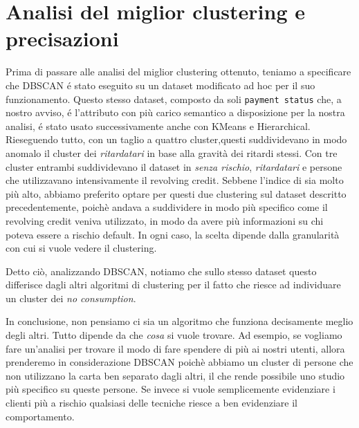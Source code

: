 \section{Analisi del miglior clustering e precisazioni}
Prima di passare alle analisi del miglior clustering ottenuto, teniamo
a specificare che DBSCAN \'e stato eseguito su un dataset modificato
ad hoc per il suo funzionamento. Questo stesso dataset, composto da soli
\texttt{payment status} che, a nostro avviso, \'e l'attributo con pi\`u
carico semantico a disposizione per la nostra analisi, \'e stato usato
successivamente anche con KMeans e Hierarchical. Rieseguendo tutto, 
con un taglio a quattro cluster,questi suddividevano in modo anomalo il cluster dei
\textit{ritardatari} in base alla gravit\`a dei ritardi stessi.
Con tre cluster entrambi suddividevano il dataset in \textit{senza rischio},
\textit{ritardatari} e persone che utilizzavano intensivamente il revolving credit.
Sebbene l'indice di \sil sia molto pi\`u alto, abbiamo preferito optare per questi due
 clustering sul dataset descritto precedentemente, poich\`e andava a suddividere in
modo pi\`u specifico come il revolving credit veniva utilizzato, in modo da avere 
pi\`u informazioni su chi poteva essere a rischio default. In ogni caso,
la scelta dipende dalla granularit\`a con cui si vuole vedere il clustering.

Detto ci\`o, analizzando DBSCAN, notiamo che sullo stesso dataset questo differisce
dagli altri algoritmi di clustering per il fatto che riesce ad individuare un cluster dei \textit{no consumption}.

In conclusione, non pensiamo ci sia un algoritmo che funziona decisamente meglio
degli altri. Tutto dipende da che \textit{cosa} si vuole trovare. 
Ad esempio, se vogliamo fare un'analisi per trovare il modo di
fare spendere di pi\`u ai nostri utenti, allora prenderemo in considerazione
DBSCAN poich\`e abbiamo un cluster di persone che non utilizzano la carta ben
separato dagli altri, il che rende possibile uno studio pi\`u specifico su queste
persone. Se invece si vuole semplicemente evidenziare i clienti pi\`u a rischio qualsiasi
delle tecniche riesce a ben evidenziare il comportamento.

